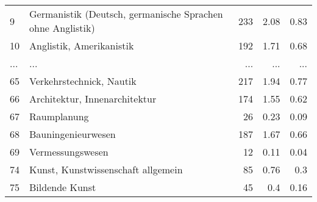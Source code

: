 \begin{longtable}{lXrrr}
        9 & \multicolumn{1}{X}{Germanistik (Deutsch, germanische Sprachen ohne Anglistik)} & %
          \num{233} &
          \num[round-mode=places,round-precision=2]{2,08} &
          \num[round-mode=places,round-precision=2]{0,83} \\
        10 & \multicolumn{1}{X}{Anglistik, Amerikanistik} & %
          \num{192} &
          \num[round-mode=places,round-precision=2]{1,71} &
          \num[round-mode=places,round-precision=2]{0,68} \\
       ... & ... & ... & ... & ... \\
        65 & \multicolumn{1}{X}{Verkehrstechnick, Nautik} & %
          \num{217} &
          \num[round-mode=places,round-precision=2]{1,94} &
          \num[round-mode=places,round-precision=2]{0,77} \\

        66 & \multicolumn{1}{X}{Architektur, Innenarchitektur} & %
          \num{174} &
          \num[round-mode=places,round-precision=2]{1,55} &
          \num[round-mode=places,round-precision=2]{0,62} \\

        67 & \multicolumn{1}{X}{Raumplanung} & %
          \num{26} &
          \num[round-mode=places,round-precision=2]{0,23} &
          \num[round-mode=places,round-precision=2]{0,09} \\

        68 & \multicolumn{1}{X}{Bauningenieurwesen} & %
          \num{187} &
          \num[round-mode=places,round-precision=2]{1,67} &
          \num[round-mode=places,round-precision=2]{0,66} \\

        69 & \multicolumn{1}{X}{Vermessungswesen} & %
          \num{12} &
          \num[round-mode=places,round-precision=2]{0,11} &
          \num[round-mode=places,round-precision=2]{0,04} \\

        74 & \multicolumn{1}{X}{Kunst, Kunstwissenschaft allgemein} & %
          \num{85} &
          \num[round-mode=places,round-precision=2]{0,76} &
          \num[round-mode=places,round-precision=2]{0,3} \\

        75 & \multicolumn{1}{X}{Bildende Kunst} & %
          \num{45} &
          \num[round-mode=places,round-precision=2]{0,4} &
          \num[round-mode=places,round-precision=2]{0,16} \\


\end{longtable}
